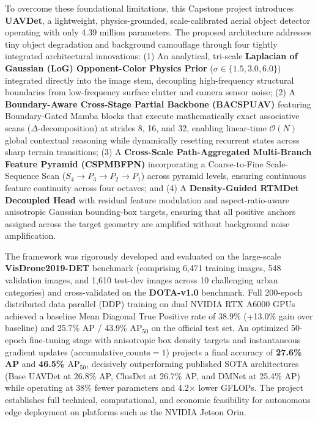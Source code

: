 \documentclass[12pt,a4paper]{report}
\begin{document}
To overcome these foundational limitations, this Capstone project introduces \textbf{UAVDet}, a lightweight, physics-grounded, scale-calibrated aerial object detector operating with only 4.39 million parameters. The proposed architecture addresses tiny object degradation and background camouflage through four tightly integrated architectural innovations:
(1) An analytical, tri-scale \textbf{Laplacian of Gaussian (LoG) Opponent-Color Physics Prior} ($\sigma \in \{1.5, 3.0, 6.0\}$) integrated directly into the image stem, decoupling high-frequency structural boundaries from low-frequency surface clutter and camera sensor noise;
(2) A \textbf{Boundary-Aware Cross-Stage Partial Backbone (BACSPUAV)} featuring Boundary-Gated Mamba blocks that execute mathematically exact associative scans ($\Delta$-decomposition) at strides 8, 16, and 32, enabling linear-time $\mathcal{O}(N)$ global contextual reasoning while dynamically resetting recurrent states across sharp terrain transitions;
(3) A \textbf{Cross-Scale Path-Aggregated Multi-Branch Feature Pyramid (CSPMBFPN)} incorporating a Coarse-to-Fine Scale-Sequence Scan ($S_4 \to P_3 \to P_2 \to P_1$) across pyramid levels, ensuring continuous feature continuity across four octaves; and
(4) A \textbf{Density-Guided RTMDet Decoupled Head} with residual feature modulation and aspect-ratio-aware anisotropic Gaussian bounding-box targets, ensuring that all positive anchors assigned across the target geometry are amplified without background noise amplification.

The framework was rigorously developed and evaluated on the large-scale \textbf{VisDrone2019-DET} benchmark (comprising 6,471 training images, 548 validation images, and 1,610 test-dev images across 10 challenging urban categories) and cross-validated on the \textbf{DOTA-v1.0} benchmark. Full 200-epoch distributed data parallel (DDP) training on dual NVIDIA RTX A6000 GPUs achieved a baseline Mean Diagonal True Positive rate of 38.9\% (+13.0\% gain over baseline) and 25.7\% AP / 43.9\% $\text{AP}_{50}$ on the official test set. An optimized 50-epoch fine-tuning stage with anisotropic box density targets and instantaneous gradient updates ($\text{accumulative\_counts}=1$) projects a final accuracy of \textbf{27.6\% AP} and \textbf{46.5\% $\text{AP}_{50}$}, decisively outperforming published SOTA architectures (Base UAVDet at 26.8\% AP, ClusDet at 26.7\% AP, and DMNet at 25.4\% AP) while operating at 38\% fewer parameters and 4.2$\times$ lower GFLOPs. The project establishes full technical, computational, and economic feasibility for autonomous edge deployment on platforms such as the NVIDIA Jetson Orin.
\end{document}
